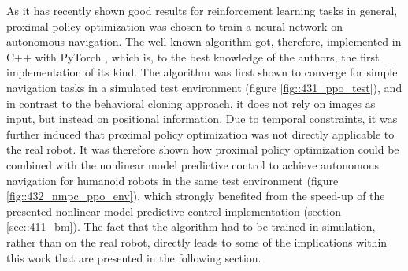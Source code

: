 As it has recently shown good results for reinforcement learning tasks in general, proximal policy optimization \cite{schulman2017proximal} was chosen to train a neural network on autonomous navigation. The well-known algorithm got, therefore, implemented in C++ with PyTorch \cite{paszke2017automatic}, which is, to the best knowledge of the authors, the first implementation of its kind. The algorithm was first shown to converge for simple navigation tasks in a simulated test environment (figure \ref{fig::431_ppo_test}), and in contrast to the behavioral cloning approach, it does not rely on images as input, but instead on positional information. Due to temporal constraints, it was further induced that proximal policy optimization was not directly applicable to the real robot. It was therefore shown how proximal policy optimization could be combined with the nonlinear model predictive control to achieve autonomous navigation for humanoid robots in the same test environment (figure \ref{fig::432_nmpc_ppo_env}), which strongly benefited from the speed-up of the presented nonlinear model predictive control implementation (section \ref{sec::411_bm}). The fact that the algorithm had to be trained in simulation, rather than on the real robot, directly leads to some of the implications within this work that are presented in the following section.
